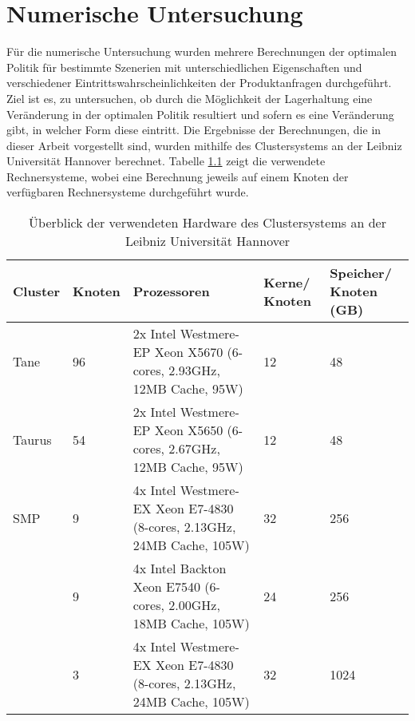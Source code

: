 \chapter{Numerische Untersuchung}
\setcounter{footnote}{97}  %

Für die numerische Untersuchung wurden mehrere Berechnungen der optimalen Politik für bestimmte Szenerien mit unterschiedlichen Eigenschaften und verschiedener Eintrittswahrscheinlichkeiten der Produktanfragen durchgeführt. Ziel ist es, zu untersuchen, ob durch die Möglichkeit der Lagerhaltung eine Veränderung in der optimalen Politik resultiert und sofern es eine Veränderung gibt, in welcher Form diese eintritt. Die Ergebnisse der Berechnungen, die in dieser Arbeit vorgestellt sind, wurden mithilfe des Clustersystems an der Leibniz Universität Hannover berechnet. Tabelle \ref{Hardware} zeigt die verwendete Rechnersysteme, wobei eine Berechnung jeweils auf einem Knoten der verfügbaren Rechnersysteme durchgeführt wurde.

\begin{table}[h!]
\renewcommand{\arraystretch}{1.5}
  \begin{center}
  \begin{small}
    \caption{Überblick der verwendeten Hardware des Clustersystems an der Leibniz Universität Hannover}  \label{Hardware}
    \vspace*{3mm}
    \begin{tabular}{llp{6cm}p{1.5cm}p{1.5cm}}   %
     Cluster & Knoten  & Prozessoren & Kerne/ Knoten  & Speicher/ Knoten (GB) \\  \hline
  Tane   & 96 & 2x Intel Westmere-EP Xeon X5670 (6-cores, 2.93GHz, 12MB Cache, 95W)  & 12 & 48 \\
   Taurus  & 54 & 2x Intel Westmere-EP Xeon X5650 (6-cores, 2.67GHz, 12MB Cache, 95W)  & 12 &  48 \\
   SMP  & 9 &4x Intel Westmere-EX Xeon E7-4830 (8-cores, 2.13GHz, 24MB Cache, 105W)   & 32 & 256  \\
    & 9 & 4x Intel Backton Xeon E7540 (6-cores, 2.00GHz, 18MB Cache, 105W)   & 24 & 256 \\
      & 3 & 4x Intel Westmere-EX Xeon E7-4830 (8-cores, 2.13GHz, 24MB Cache, 105W)   & 32 & 1024  \\ \hline
    \end{tabular} \\[3mm]
    \end{small}
  \end{center}
\end{table}

